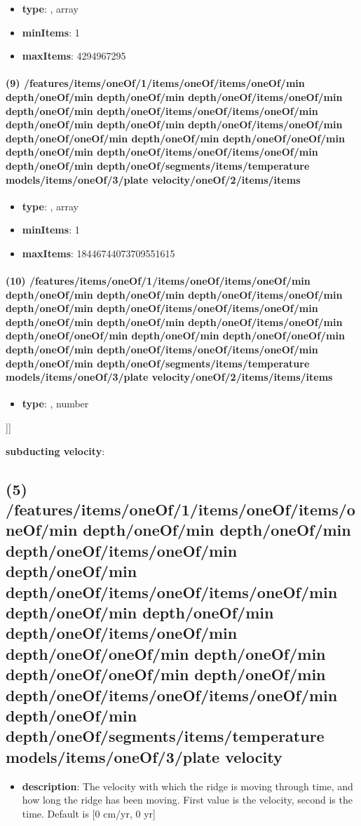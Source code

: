 \begin{itemize}[leftmargin=8em]\item {\bf type}: , array\item {\bf minItems}: 1
\item {\bf maxItems}: 4294967295
\end{itemize}\paragraph{(9) /features/items/oneOf/1/items/oneOf/items/oneOf/min depth/oneOf/min depth/oneOf/min depth/oneOf/items/oneOf/min depth/oneOf/min depth/oneOf/items/oneOf/items/oneOf/min depth/oneOf/min depth/oneOf/min depth/oneOf/items/oneOf/min depth/oneOf/oneOf/min depth/oneOf/min depth/oneOf/oneOf/min depth/oneOf/min depth/oneOf/items/oneOf/items/oneOf/min depth/oneOf/min depth/oneOf/segments/items/temperature models/items/oneOf/3/plate velocity/oneOf/2/items/items}
\begin{itemize}[leftmargin=9em]\item {\bf type}: , array\item {\bf minItems}: 1
\item {\bf maxItems}: 18446744073709551615
\end{itemize}\paragraph{(10) /features/items/oneOf/1/items/oneOf/items/oneOf/min depth/oneOf/min depth/oneOf/min depth/oneOf/items/oneOf/min depth/oneOf/min depth/oneOf/items/oneOf/items/oneOf/min depth/oneOf/min depth/oneOf/min depth/oneOf/items/oneOf/min depth/oneOf/oneOf/min depth/oneOf/min depth/oneOf/oneOf/min depth/oneOf/min depth/oneOf/items/oneOf/items/oneOf/min depth/oneOf/min depth/oneOf/segments/items/temperature models/items/oneOf/3/plate velocity/oneOf/2/items/items/items}
\begin{itemize}[leftmargin=10em]\item {\bf type}: , number\end{itemize}]]\item {\bf subducting velocity}: \subsection{(5) /features/items/oneOf/1/items/oneOf/items/oneOf/min depth/oneOf/min depth/oneOf/min depth/oneOf/items/oneOf/min depth/oneOf/min depth/oneOf/items/oneOf/items/oneOf/min depth/oneOf/min depth/oneOf/min depth/oneOf/items/oneOf/min depth/oneOf/oneOf/min depth/oneOf/min depth/oneOf/oneOf/min depth/oneOf/min depth/oneOf/items/oneOf/items/oneOf/min depth/oneOf/min depth/oneOf/segments/items/temperature models/items/oneOf/3/plate velocity}
\begin{itemize}[leftmargin=5em]\item {\bf description}: The velocity with which the ridge is moving through time, and how long the ridge has been moving. First value is the velocity, second is the time. Default is [0 cm/yr, 0 yr]
\end{itemize}

